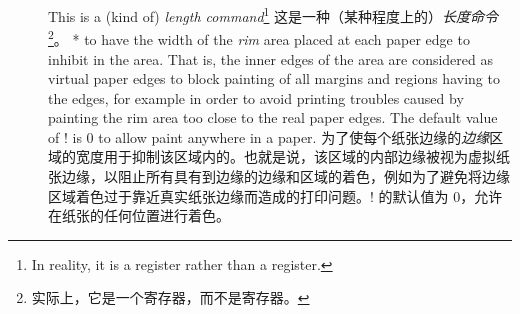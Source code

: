 \begin{description}
\item[\Midx{\!\pagerim!}]\mbox{}\par
{}
\begin{paracol}{2}
This is a (kind of) \emph{length command}\footnote{%
In reality, it is a  register rather than a  register.}
\switchcolumn
这是一种（某种程度上的）\emph{长度命令}\footnote{实际上，它是一个寄存器，而不是寄存器。}。
\switchcolumn[0]*
to have the width of the \emph{rim} area placed at each paper edge to 
inhibit \bgpaint{} in the area.  That is, the inner edges of the area are
considered as virtual paper edges to block painting of all margins and
regions having \bginfext{} to the edges, for example in order to
avoid printing troubles caused by painting the rim area too close to the
real paper edges.  The default value of \!\pagerim! is 0 to allow paint
anywhere in a paper.
\switchcolumn
为了使每个纸张边缘的\emph{边缘}区域的宽度用于抑制该区域内的\bgpaint{}。也就是说，该区域的内部边缘被视为虚拟纸张边缘，以阻止所有具有\bginfext{}到边缘的边缘和区域的着色，例如为了避免将边缘区域着色过于靠近真实纸张边缘而造成的打印问题。\!\pagerim! 的默认值为 0，允许在纸张的任何位置进行着色。    
\end{paracol}
\end{description}
